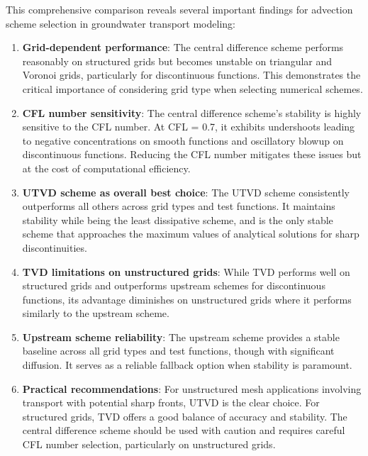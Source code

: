 This comprehensive comparison reveals several important findings for advection scheme selection in groundwater transport modeling:

\begin{enumerate}
\item \textbf{Grid-dependent performance}: The central difference scheme performs reasonably on structured grids but becomes unstable on triangular and Voronoi grids, particularly for discontinuous functions. This demonstrates the critical importance of considering grid type when selecting numerical schemes.

\item \textbf{CFL number sensitivity}: The central difference scheme's stability is highly sensitive to the CFL number. At CFL = 0.7, it exhibits undershoots leading to negative concentrations on smooth functions and oscillatory blowup on discontinuous functions. Reducing the CFL number mitigates these issues but at the cost of computational efficiency.

\item \textbf{UTVD scheme as overall best choice}: The UTVD scheme consistently outperforms all others across grid types and test functions. It maintains stability while being the least dissipative scheme, and is the only stable scheme that approaches the maximum values of analytical solutions for sharp discontinuities.

\item \textbf{TVD limitations on unstructured grids}: While TVD performs well on structured grids and outperforms upstream schemes for discontinuous functions, its advantage diminishes on unstructured grids where it performs similarly to the upstream scheme.

\item \textbf{Upstream scheme reliability}: The upstream scheme provides a stable baseline across all grid types and test functions, though with significant diffusion. It serves as a reliable fallback option when stability is paramount.

\item \textbf{Practical recommendations}: For unstructured mesh applications involving transport with potential sharp fronts, UTVD is the clear choice. For structured grids, TVD offers a good balance of accuracy and stability. The central difference scheme should be used with caution and requires careful CFL number selection, particularly on unstructured grids.
\end{enumerate}                 
